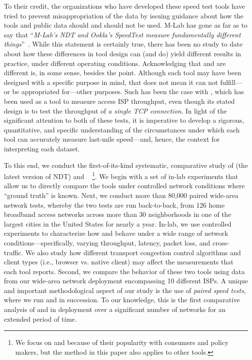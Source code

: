 To their credit, the organizations who have developed these speed test tools
have tried to prevent misappropriation of the data by issuing guidance about how
the tools and public data should and should not be used. M-Lab has gone as far
as to say that ``\textit{M-Lab's NDT and Ookla's SpeedTest measure fundamentally
different things}''~\cite{mlab-issue-email-1}. While this statement is certainly
true, there has been no study to date about how these differences in tool design
can (and do) yield different results in practice, under different operating
conditions. Acknowledging that \ookla and \ndt are different is, in some sense,
besides the point. %
Although each tool may have been designed with a specific purpose in mind, that
does not mean it can not fulfill---or be appropriated for---other purposes. Such
has been the case with \ndt, which has been used as a tool to measure access ISP
throughput, even though its stated design is to test the throughput of {\em a
single TCP connection}. In light of the significant attention to both of these
tests, it is imperative to develop a rigorous, quantitative, and specific
understanding of the circumstances under which each tool can accurately measure
last-mile speed---and, hence, the context for interpreting each dataset.

To this end, we conduct the first-of-its-kind systematic, comparative study of
\ndt (the latest version of NDT) and \ookla~\cite{macmillan2023comparative} \footnote{We focus on \ookla and \ndt because of   
their popularity with consumers and policy 
makers, but
the method in this paper also applies to other tools.}. We begin 
with a set of in-lab
experiments that allow us to directly compare the tools under controlled network
conditions where ``ground truth'' is known. Next, we conduct more than 80,000
paired wide-area network tests, whereby the two tests are run back-to-back, from
126 home broadband access networks across more than 30 neighborhoods in
one of the largest cities in the United States for nearly a year. In-lab, we use
controlled experiments to characterize how \ndt and \ookla behave under a wide
range of network conditions---specifically, varying throughput, latency, packet
loss, and cross-traffic. We also study how different transport congestion
control algorithms and client types (i.e., browser vs. native client) may affect
the measurements that each tool reports.  Second, we compare the behavior of
these two tools using data from our wide-area network deployment encompassing 10
different ISPs. A unique and important methodological aspect of our study is the
use of \textit{paired speed tests}, where we run \ookla and \ndt in succession.
To our knowledge, this is the first comparative analysis of \ookla and \ndt in
deployment over a significant number of networks for an extended period of time. 


